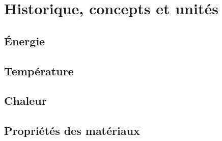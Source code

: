 \documentclass[11pt,a4paper]{book}
\begin{document}
\chapter{Historique, concepts et unités}
\label{chap:concepts}

\section{Énergie}

\section{Température}

\section{Chaleur}

\section{Propriétés des matériaux}






\end{document}
